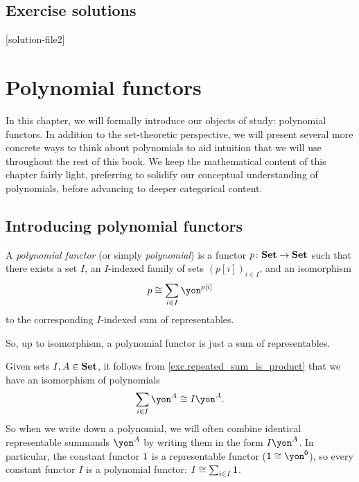 \documentclass[Book-Poly]{subfiles}
\begin{document}
\section{Exercise solutions}
{\footnotesize
    }

[solution-file2]

\chapter{Polynomial functors} \label{ch.poly.obj}

In this chapter, we will formally introduce our objects of study: polynomial functors.
In addition to the set-theoretic perspective, we will present several more concrete ways to think about polynomials to aid intuition that we will use throughout the rest of this book.
We keep the mathematical content of this chapter fairly light, preferring to solidify our conceptual understanding of polynomials, before advancing to deeper categorical content.

\section{Introducing polynomial functors} \label{sec.poly.obj.intro}

\begin{definition}
    A \emph{polynomial functor} (or simply \emph{polynomial}) is a functor $p\colon\mathbf{Set}\to\mathbf{Set}$ such that there exists a set $I$, an $I$-indexed family of sets $(p[i])_{i\in I}$, and an isomorphism
    \[
    p\iso\sum_{i\in I}\yon^{p[i]}
    \]
    to the corresponding $I$-indexed sum of representables.
\end{definition}

So, up to isomorphism, a polynomial functor is just a sum of representables.

\begin{remark}
    Given sets $I, A \in \mathbf{Set}$, it follows from \cref{exc.repeated_sum_is_product} that we have an isomorphism of polynomials
    \[
    \sum_{i \in I} \yon^A \iso I\yon^A.
    \]
    So when we write down a polynomial, we will often combine identical representable summands $\yon^A$ by writing them in the form $I\yon^A$.
    In particular, the constant functor $\textsf{1}$ is a representable functor ($\1 \iso \yon^\0$), so every constant functor $I$ is a polynomial functor: $I \cong \sum_{i \in I} \textsf{1}$.
\end{remark}
\end{document}
